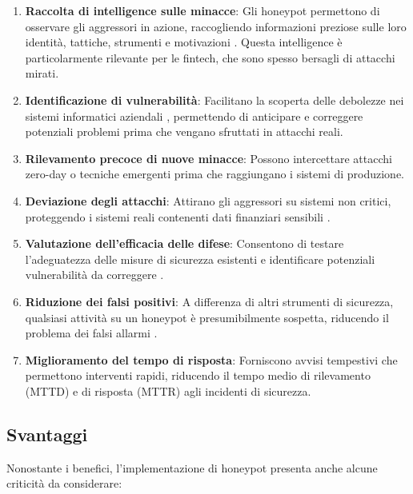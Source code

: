 \begin{enumerate}
    \item \textbf{Raccolta di intelligence sulle minacce}: Gli honeypot permettono di osservare gli aggressori in azione, raccogliendo informazioni preziose sulle loro identità, tattiche, strumenti e motivazioni \cite{proofpoint2024, fortinet2023}. Questa intelligence è particolarmente rilevante per le fintech, che sono spesso bersagli di attacchi mirati.
    \item \textbf{Identificazione di vulnerabilità}: Facilitano la scoperta delle debolezze nei sistemi informatici aziendali \cite{universeit2021}, permettendo di anticipare e correggere potenziali problemi prima che vengano sfruttati in attacchi reali.
    \item \textbf{Rilevamento precoce di nuove minacce}: Possono intercettare attacchi zero-day o tecniche emergenti prima che raggiungano i sistemi di produzione.
    \item \textbf{Deviazione degli attacchi}: Attirano gli aggressori su sistemi non critici, proteggendo i sistemi reali contenenti dati finanziari sensibili \cite{vito2024}.
    \item \textbf{Valutazione dell'efficacia delle difese}: Consentono di testare l'adeguatezza delle misure di sicurezza esistenti e identificare potenziali vulnerabilità da correggere \cite{vito2024}.
    \item \textbf{Riduzione dei falsi positivi}: A differenza di altri strumenti di sicurezza, qualsiasi attività su un honeypot è presumibilmente sospetta, riducendo il problema dei falsi allarmi \cite{nordvpn}.
    \item \textbf{Miglioramento del tempo di risposta}: Forniscono avvisi tempestivi che permettono interventi rapidi, riducendo il tempo medio di rilevamento (MTTD) e di risposta (MTTR) agli incidenti di sicurezza.
\end{enumerate}

\subsection{Svantaggi}
\label{subsec:svantaggi}

Nonostante i benefici, l'implementazione di honeypot presenta anche alcune criticità da considerare:

